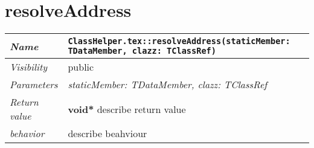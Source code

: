  \section{resolveAddress}
\begin{longtable}{p{3cm} @{\hskip 1cm} p{12cm}}
 \hline
\textit{Name} & \texttt{ClassHelper.tex::resolveAddress(staticMember: TDataMember, clazz: TClassRef)}\\
\hline
 \textit{Visibility} & public\\
\hline
\textit{Parameters} & \textit{staticMember: TDataMember, clazz: TClassRef}\\
\hline
\textit{Return value} & \textbf{ void*} describe return value\\
  \hline
 \textit{behavior} & describe beahviour \\
\hline
\end{longtable} \pagebreak
 